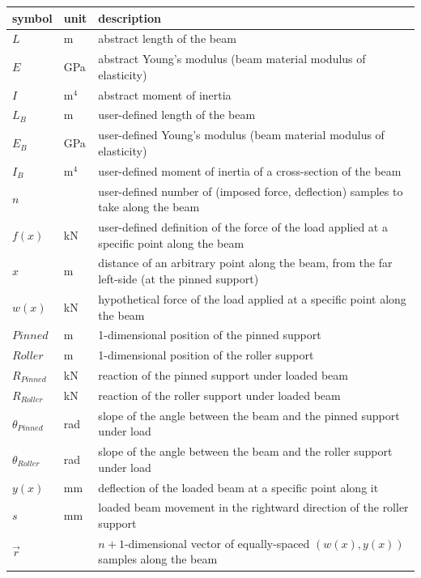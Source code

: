 \documentclass[12pt]{article}
\begin{document}
\renewcommand{\arraystretch}{1.2}
\noindent\begin{longtable*}{l l p{12cm}} \toprule
    \textbf{symbol} & \textbf{unit} & \textbf{description}\\
    \midrule
    \(L\) & \si{\metre} & abstract length of the beam \\
    \(E\) & \si{\giga\pascal} & abstract Young's modulus (beam material modulus of elasticity) \\
    \(I\) & \(\si{\metre{}}^{4}\) & abstract moment of inertia \\
    \(L_{B}\) & \si{\metre} & user-defined length of the beam \\
    \(E_{B}\) & \si{\giga\pascal} & user-defined Young's modulus (beam material modulus of elasticity) \\
    \(I_{B}\) & \(\si{\metre{}}^{4}\) & user-defined moment of inertia of a cross-section of the beam \\
    \(n\) & \textemdash{} & user-defined number of (imposed force, deflection) samples to take along the beam \\
    \(f(x)\) & \si{\kilo\newton} & user-defined definition of the force of the load applied at a specific point along the beam \\
    \(x\) & \si{\metre} & distance of an arbitrary point along the beam, from the far left-side (at the pinned support) \\
    \(w(x)\) & \si{\kilo\newton} & hypothetical force of the load applied at a specific point along the beam \\
    \(\mathit{Pinned}\) & \si{\metre} & 1-dimensional position of the pinned support \\
    \(\mathit{Roller}\) & \si{\metre} & 1-dimensional position of the roller support \\
    \(R_{\mathit{Pinned}}\) & \si{\kilo\newton} & reaction of the pinned support under loaded beam \\
    \(R_{\mathit{Roller}}\) & \si{\kilo\newton} & reaction of the roller support under loaded beam \\
    \(\theta{}_{\mathit{Pinned}}\) & \si{\radian} & slope of the angle between the beam and the pinned support under load \\
    \(\theta{}_{\mathit{Roller}}\) & \si{\radian} & slope of the angle between the beam and the roller support under load \\
    \(y(x)\) & \si{\milli\metre} & deflection of the loaded beam at a specific point along it \\
    \(s\) & \si{\milli\metre} & loaded beam movement in the rightward direction of the roller support \\
    \(\vec{r}\) & \textemdash{} & $n+1$-dimensional vector of equally-spaced $(w(x),y(x))$ samples along the beam \\
    \bottomrule
\end{longtable*}
\end{document}
